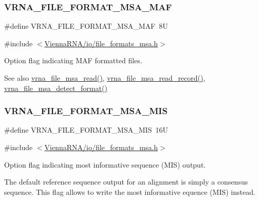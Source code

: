 \subsubsection{\texorpdfstring{VRNA\_FILE\_FORMAT\_MSA\_MAF}{VRNA\_FILE\_FORMAT\_MSA\_MAF}}
{\footnotesize\ttfamily \#define V\+R\+N\+A\+\_\+\+F\+I\+L\+E\+\_\+\+F\+O\+R\+M\+A\+T\+\_\+\+M\+S\+A\+\_\+\+M\+AF~8U}



{\ttfamily \#include $<$\mbox{\hyperlink{io_2file__formats__msa_8h}{Vienna\+R\+N\+A/io/file\+\_\+formats\+\_\+msa.\+h}}$>$}



Option flag indicating M\+AF formatted files. 

\begin{DoxySeeAlso}{See also}
\mbox{\hyperlink{group__file__formats__msa_gad02d5d12bda54611c915a1019323b7be}{vrna\+\_\+file\+\_\+msa\+\_\+read()}}, \mbox{\hyperlink{group__file__formats__msa_gad4203a438622b2df7bc2f16578d54799}{vrna\+\_\+file\+\_\+msa\+\_\+read\+\_\+record()}}, \mbox{\hyperlink{group__file__formats__msa_gade4fa8136ebb2d0f7eb3f8b59a8658e3}{vrna\+\_\+file\+\_\+msa\+\_\+detect\+\_\+format()}} 
\end{DoxySeeAlso}
\mbox{\label{group__file__formats__msa_ga494488a771aa0c602fb4cf445be34d47}} 
\subsubsection{\texorpdfstring{VRNA\_FILE\_FORMAT\_MSA\_MIS}{VRNA\_FILE\_FORMAT\_MSA\_MIS}}
{\footnotesize\ttfamily \#define V\+R\+N\+A\+\_\+\+F\+I\+L\+E\+\_\+\+F\+O\+R\+M\+A\+T\+\_\+\+M\+S\+A\+\_\+\+M\+IS~16U}



{\ttfamily \#include $<$\mbox{\hyperlink{io_2file__formats__msa_8h}{Vienna\+R\+N\+A/io/file\+\_\+formats\+\_\+msa.\+h}}$>$}



Option flag indicating most informative sequence (M\+IS) output. 

The default reference sequence output for an alignment is simply a consensus sequence. This flag allows to write the most informative equence (M\+IS) instead.

